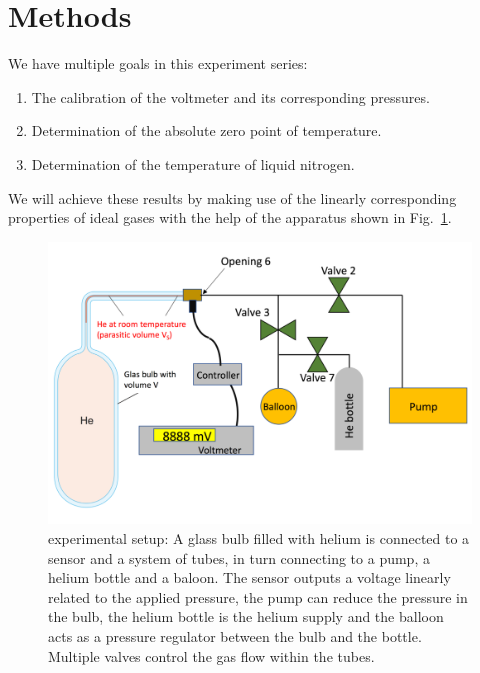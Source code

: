 \section{Methods}


    We have multiple goals in this experiment series:
    \begin{enumerate}
        \item The calibration of the voltmeter and its corresponding pressures.
        \item Determination of the absolute zero point of temperature.
        \item Determination of the temperature of liquid nitrogen.
    \end{enumerate}
    We will achieve these results by making use of the linearly corresponding properties of ideal gases with the help of the apparatus shown in Fig.~\ref{fig_setup}.

    \begin{figure}[H]
        \centering
        \includegraphics[]{src/images/experimental_setup.png}
        \caption{experimental setup: A glass bulb filled with helium is connected to a sensor and a system of tubes, in turn connecting to a pump, a helium bottle and a baloon.
        The sensor outputs a voltage linearly related to the applied pressure, the pump can reduce the pressure in the bulb, the helium bottle is the helium supply and the balloon acts as a pressure regulator between the bulb and the bottle.
        Multiple valves control the gas flow within the tubes.}
        \label{fig_setup}
    \end{figure}

